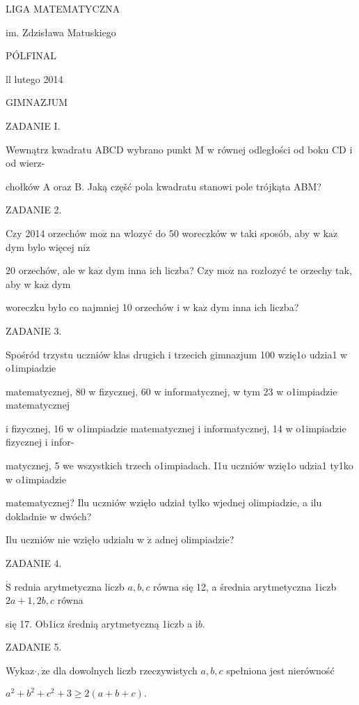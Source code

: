 \documentclass[a4paper,12pt]{article}
\begin{document}
LIGA MATEMATYCZNA

im. Zdzisława Matuskiego

PÓLFINAL

ll lutego 2014

GIMNAZJUM

ZADANIE I.

Wewnątrz kwadratu ABCD wybrano punkt M w równej odległości od boku CD i od wierz-

chołków A oraz B. Jaką częšć pola kwadratu stanowi pole trójkąta ABM?

ZADANIE 2.

Czy 2014 orzechów $\mathrm{m}\mathrm{o}\dot{\mathrm{z}}$ na wlozyć do 50 woreczków w taki sposób, aby w $\mathrm{k}\mathrm{a}\dot{\mathrm{z}}$ dym bylo więcej $\mathrm{n}\mathrm{i}\dot{\mathrm{z}}$

$20$ orzechów, ale w $\mathrm{k}\mathrm{a}\dot{\mathrm{z}}$ dym inna ich liczba? Czy $\mathrm{m}\mathrm{o}\dot{\mathrm{z}}$ na rozłozyć te orzechy tak, aby w $\mathrm{k}\mathrm{a}\dot{\mathrm{z}}$ dym

woreczku było co najmniej 10 orzechów i w $\mathrm{k}\mathrm{a}\dot{\mathrm{z}}$ dym inna ich liczba?

ZADANIE 3.

Spośród trzystu uczniów klas drugich i trzecich gimnazjum 100 wzię1o udzia1 w o1impiadzie

matematycznej, 80 w fizycznej, 60 w informatycznej, w tym 23 w o1impiadzie matematycznej

i fizycznej, 16 w o1impiadzie matematycznej i informatycznej, 14 w o1impiadzie fizycznej i infor-

matycznej, 5 we wszystkich trzech o1impiadach. I1u uczniów wzię1o udzia1 ty1ko w o1impiadzie

matematycznej? Ilu uczniów wzięło udział tylko wjednej olimpiadzie, a ilu dokladnie w dwóch?

Ilu uczniów nie wzięło udzialu w $\dot{\mathrm{z}}$ adnej olimpiadzie?

ZADANIE 4.

$\acute{\mathrm{S}}$ rednia arytmetyczna liczb $a, b, c$ równa się 12, a średnia arytmetyczna 1iczb $2a+1, 2b, c$ równa

się 17. Ob1icz średnią arytmetyczną 1iczb a $\mathrm{i}b.$

ZADANIE 5.

Wykaz$\cdot, \dot{\mathrm{z}}\mathrm{e}$ dla dowolnych liczb rzeczywistych $a, b, c$ spełniona jest nierówność

$a^{2}+b^{2}+c^{2}+3\geq 2(a+b+c).$
\end{document}
